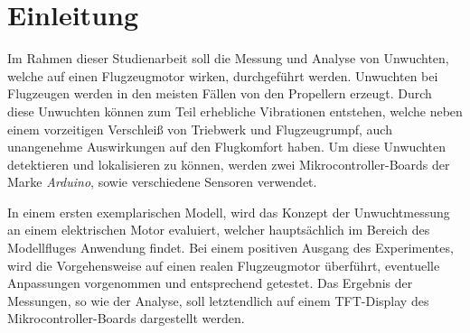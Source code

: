 
\chapter{Einleitung}
Im Rahmen dieser Studienarbeit soll die Messung und Analyse von Unwuchten, welche auf einen Flugzeugmotor wirken, durchgeführt werden.
Unwuchten bei Flugzeugen werden in den meisten Fällen von den Propellern erzeugt.
Durch diese Unwuchten können zum Teil erhebliche Vibrationen entstehen, welche neben einem vorzeitigen Verschleiß von Triebwerk und Flugzeugrumpf, auch unangenehme Auswirkungen auf den Flugkomfort haben.
Um diese Unwuchten detektieren und lokalisieren zu können, werden zwei Mikrocontroller-Boards der Marke \textit{Arduino}, sowie verschiedene Sensoren verwendet.

In einem ersten exemplarischen Modell, wird das Konzept der Unwuchtmessung an einem elektrischen Motor evaluiert, welcher hauptsächlich im Bereich des Modellfluges Anwendung findet.
Bei einem positiven Ausgang des Experimentes, wird die Vorgehensweise auf einen realen Flugzeugmotor überführt, eventuelle Anpassungen vorgenommen und entsprechend getestet. 
Das Ergebnis der Messungen, so wie der Analyse, soll letztendlich auf einem TFT-Display des Mikrocontroller-Boards dargestellt werden.